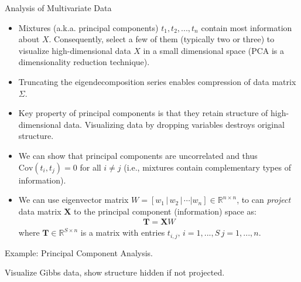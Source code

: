 \documentclass[9pt]{beamer}
\begin{document}
\begin{frame}{Analysis of Multivariate Data}

\begin{itemize}
\item Mixtures (a.k.a. principal components) $t_1,t_2,...,t_n$ contain most information about $X$. Consequently, select a few of them (typically two or three) to visualize high-dimensional data $X$ in a small dimensional space (PCA is a dimensionality reduction technique). 

\item Truncating the eigendecomposition series enables compression of data matrix $\Sigma$. 

\item Key property of principal components is that they retain structure of high-dimensional data. Visualizing data by dropping variables destroys original structure.

\item We can show that principal components are uncorrelated and thus $\textrm{Cov}(t_i,t_j)=0$ for all $i\neq j$ (i.e., mixtures contain complementary types of information). 

\item We can use eigenvector matrix $W=[w_1\,|\,w_2\,|\,\cdots|w_n]\in \mathbb{R}^{n\times n}$, to can {\em project} data matrix $\mathbf{X}$ to the principal component (information) space as: 
\begin{align*}
\mathbf{T}=\mathbf{X}W
\end{align*}
where $\mathbf{T}\in \mathbb{R}^{S\times n}$ is a matrix with entries $t_{i,j},\,i=1,...,S\, j=1,...,n$. 

 
\end{itemize}


\end{frame}

%
\begin{frame}{Example: Principal Component Analysis.}

\begin{block}{}
Visualize Gibbs data, show structure hidden if not projected. 
\end{block}

\end{frame}



\end{document}
